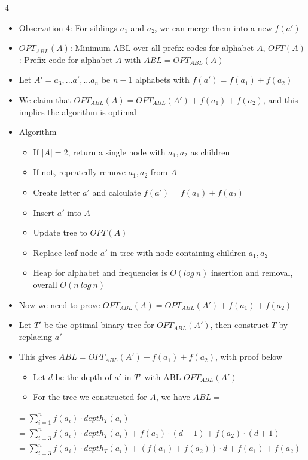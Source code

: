 \documentclass[10pt, landscape]{article}
\begin{document}
\begin{multicols*}{4}
\begin{itemize}
    \item Observation 4: For siblings $a_1$ and $a_2$, we can merge them into a new $f(a')$
    \item $OPT_{ABL}(A)$: Minimum ABL over all prefix codes for alphabet $A$, $OPT(A)$: Prefix code for alphabet $A$ with $ABL=OPT_{ABL}(A)$
    \item Let $A'=a_3,...a',...a_n$ be $n-1$ alphabets with $f(a')=f(a_1)+f(a_2)$
    \item We claim that $OPT_{ABL}(A)=OPT_{ABL}(A')+f(a_1)+f(a_2)$, and this implies the algorithm is optimal
    \item Algorithm
    \begin{itemize}
        \item If $|A|=2$, return a single node with $a_1,a_2$ as children
        \item If not, repeatedly remove $a_1, a_2$ from $A$
        \item Create letter $a'$ and calculate $f(a')=f(a_1)+f(a_2)$
        \item Insert $a'$ into $A$
        \item Update tree to $OPT(A)$
        \item Replace leaf node $a'$ in tree with node containing children $a_1, a_2$
        \item Heap for alphabet and frequencies is $O(log\ n)$ insertion and removal, overall $O(n\ log\ n)$
    \end{itemize}
    \item Now we need to prove $OPT_{ABL}(A)=OPT_{ABL}(A')+f(a_1)+f(a_2)$
    \item Let $T'$ be the optimal binary tree for $OPT_{ABL}(A')$, then construct $T$ by replacing $a'$
    \item This gives $ABL=OPT_{ABL}(A')+f(a_1)+f(a_2)$, with proof below
    \begin{itemize}
        \item Let $d$ be the depth of $a'$ in $T'$ with ABL $OPT_{ABL}(A')$
        \item For the tree we constructed for $A$, we have $ABL=$
    \end{itemize}
\end{itemize}
{\tiny
\begin{align*}
    &=\sum_{i=1}^n f(a_i) \cdot depth_T(a_i)\\
    &= \sum_{i=3}^n f(a_i) \cdot depth_T(a_i)+f(a_1) \cdot (d+1) + f(a_2) \cdot (d+1)\\
    &= \sum_{i=3}^n f(a_i)\cdot depth_T(a_i) + (f(a_1) + f(a_2)) \cdot d + f(a_1) + f(a_2) \\

\end{align*}}
\end{multicols*}
\end{document}
